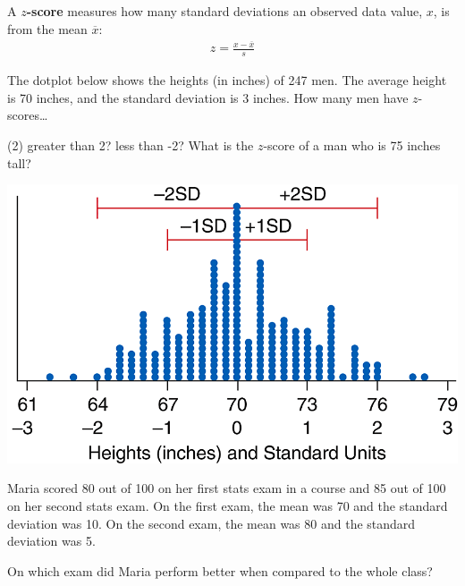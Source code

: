 \documentclass[../mathNotesPreamble]{subfiles}
\begin{document}
  \begin{defn*}
    A \textbf{$z$-score} measures how many standard deviations an observed data value, $x$, is from the mean $\overline{x}$:
    \begin{align*}
      z=\frac{x-\overline{x}}{s}
    \end{align*}
  \end{defn*}

  \begin{ex*}
    The dotplot below shows the heights (in inches) of 247 men. The average height is 70 inches, and the standard deviation is 3 inches. How many men have $z$-scores\dots
    \begin{tasks}[after-item-skip=\baselineskip, label=\textbullet](2)
      \task greater than 2?
      \task less than -2?
      \task* What is the $z$-score of a man who is 75 inches tall?
    \end{tasks}
  \end{ex*}
  \begin{center}
    \includegraphics[width=0.6\linewidth]{images/math211_figure_3p12}
  \end{center}
  \pagebreak

  \begin{ex*}
    Maria scored 80 out of 100 on her first stats exam in a course and 85 out of 100 on her second stats exam. On the first exam, the mean was 70 and the standard deviation was 10. On the second exam, the mean was 80 and the standard deviation was 5.

    On which exam did Maria perform better when compared to the whole class?
  \end{ex*}

  \pagebreak
\end{document}
